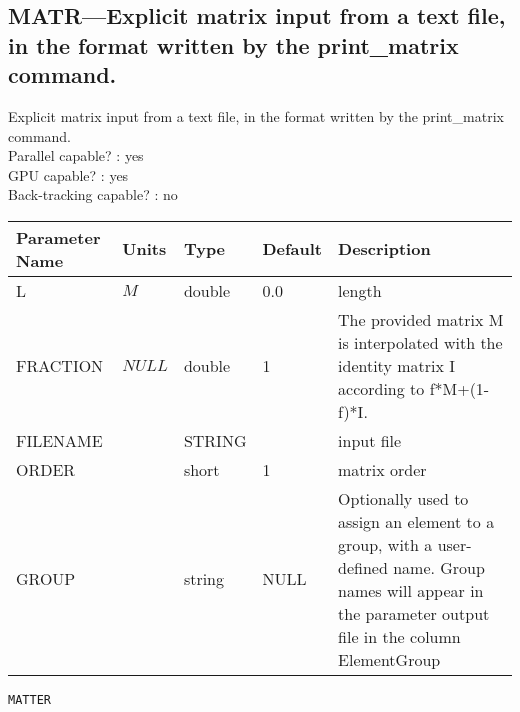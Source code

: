 \subsection{MATR---Explicit matrix input from a text file, in the format written by the print\_matrix command.}
Explicit matrix input from a text file, in the format written by the print\_matrix command.
\\
Parallel capable? : yes\\
GPU capable? : yes\\
Back-tracking capable? : no\\
\begin{tabular}{|l|l|l|l|p{\descwidth}|} \hline
Parameter Name & Units & Type & Default & Description \\ \hline 
L & $M$ & double &  0.0 & length  \\ \hline 
FRACTION & $NULL$ & double &   1 & The provided matrix M is interpolated with the identity matrix I according to f*M+(1-f)*I.  \\ \hline 
FILENAME &  & STRING &                   & input file  \\ \hline 
ORDER &  & short &   1               & matrix order  \\ \hline 
GROUP &  & string & NULL & Optionally used to assign an element to a group, with a user-defined name.  Group names will appear in the parameter output file in the column ElementGroup  \\ \hline 
\end{tabular}

\vspace*{0.5in}

\newpage
\begin{center}{\Large\verb|MATTER|}\end{center}
